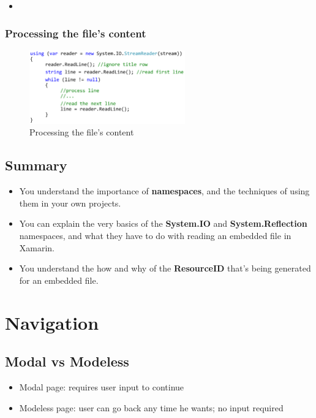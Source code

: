 \documentclass{article}
\newcommand{\bold}[1]{\textbf{#1}}
\begin{document}
\begin{itemize}
    \item 
\end{itemize}

\subsubsection{Processing the file's content}

\begin{figure}[H]
    \centering
    \includegraphics[width=0.6\textwidth]{embedded-files2.png}
    \caption{Processing the file's content}
\end{figure}

\subsection{Summary}

\begin{itemize}
    \item You understand the importance of \bold{namespaces}, and the techniques of using them in your own projects.
    \item You can explain the very basics of the \bold{System.IO} and \bold{System.Reflection} namespaces, and what they have to do with reading an embedded file in Xamarin.
    \item You understand the how and why of the \bold{ResourceID} that’s being generated for an embedded file.
\end{itemize}

\section{Navigation}

\subsection{Modal vs Modeless}

\begin{itemize}
    \item Modal page: requires user input to continue
    \item Modeless page: user can go back any time he wants; no input required
\end{itemize}
\end{document}
